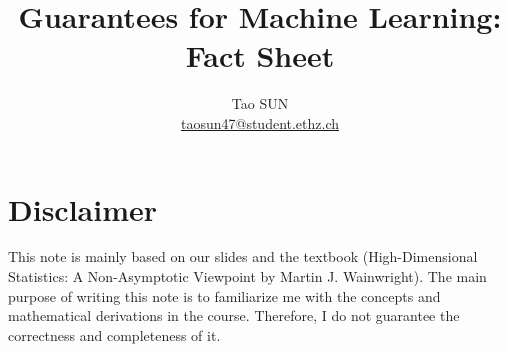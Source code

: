 \documentclass{article}
\numberwithin{equation}{section}
\theoremstyle{styledefinition}
\begin{document}
\title{Guarantees for Machine Learning: Fact Sheet}
\author{Tao SUN \\ \url{taosun47@student.ethz.ch}}

\maketitle

\tableofcontents

\vspace{2em}
\section*{Disclaimer}
This note is mainly based on our slides and the textbook (High-Dimensional Statistics: A Non-Asymptotic Viewpoint by Martin J. Wainwright). The main purpose of writing this note is to familiarize me with the concepts and mathematical derivations in the course. Therefore, I do not guarantee the correctness and completeness of it.


\newpage

\begin{multicols}{2}






\end{multicols}
\end{document}
